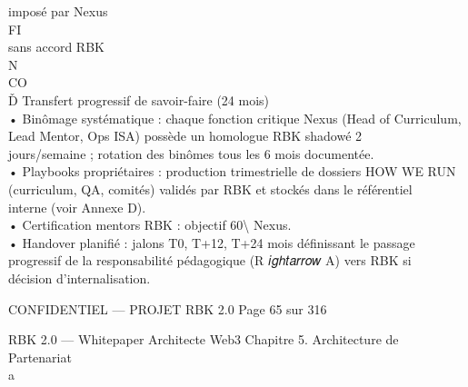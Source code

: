 \documentclass[12pt,landscape,a4paper]{article}
\newenvironment{confidential}
{\begin{tcolorbox}[
    colback=rbkred!5!white,
    colframe=rbkred!75!black,
    title=CONFIDENTIEL,
    fonttitle=\bfseries\color{white},
    coltitle=rbkred!75!black,
    breakable,
    enhanced,
    frame hidden,
    borderline west={2pt}{0pt}{rbkred!75!black}
]}
{\end{tcolorbox}}
\begin{document}
imposé par Nexus\\
\vspace{0.5em}
\vspace{0.5em}
\vspace{0.5em}
\vspace{0.5em}
FI\\
sans accord RBK\\
\vspace{0.5em}
\vspace{0.5em}
\vspace{0.5em}
N\\
CO\\
Ď Transfert progressif de savoir-faire (24 mois)\\
• Binômage systématique : chaque fonction critique Nexus (Head of Curriculum, Lead Mentor, Ops ISA) possède un homologue RBK shadowé 2\\
jours/semaine ; rotation des binômes tous les 6 mois documentée.\\
• Playbooks propriétaires : production trimestrielle de dossiers HOW WE RUN (curriculum, QA, comités) validés par RBK et stockés dans le référentiel\\
interne (voir Annexe D).\\
• Certification mentors RBK : objectif 60\textbackslash{}%
Nexus.\\
• Handover planifié : jalons T0, T+12, T+24 mois définissant le passage progressif de la responsabilité pédagogique (R 𝑖𝑔ℎ𝑡𝑎𝑟𝑟𝑜𝑤 A) vers RBK si\\
décision d’internalisation.\\
\vspace{0.5em}
\vspace{0.5em}
\vspace{0.5em}
\vspace{0.5em}
\begin{confidential}CONFIDENTIEL — PROJET RBK 2.0                                          Page 65 sur 316\end{confidential}
RBK 2.0 — Whitepaper Architecte Web3                                                                                    Chapitre 5. Architecture de Partenariat\\
\vspace{0.5em}
\vspace{0.5em}
\vspace{0.5em}
a\\
\end{document}
